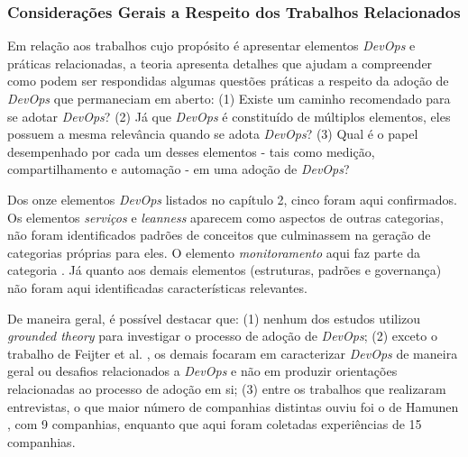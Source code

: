 \subsubsection{Considerações Gerais a Respeito dos Trabalhos Relacionados}

Em relação aos trabalhos cujo propósito é apresentar elementos {\it DevOps} e
práticas relacionadas, a teoria apresenta detalhes que ajudam a
compreender como podem ser respondidas algumas questões práticas a
respeito da adoção de {\it DevOps} que permaneciam em aberto: (1) Existe um caminho
recomendado para se adotar \textit{DevOps}? (2) Já que \textit{DevOps} é
constituído de múltiplos elementos, eles possuem a mesma relevância quando se
adota \textit{DevOps}? (3) Qual é o papel desempenhado por cada um desses
elementos - tais como medição, compartilhamento e automação - em uma adoção de
\textit{DevOps}?

Dos onze elementos {\it DevOps} listados no capítulo 2, cinco foram aqui
confirmados. Os elementos \emph{serviços} e \emph{leanness} aparecem como
aspectos de outras categorias, não foram identificados padrões de conceitos
que culminassem na geração de categorias próprias para eles. O elemento
\emph{monitoramento} aqui faz parte da categoria . Já
quanto aos demais elementos (estruturas, padrões e governança) não foram aqui
identificadas características relevantes.

De maneira geral, é possível destacar que: (1) nenhum dos estudos utilizou
{\it grounded theory} para investigar o processo de adoção de {\it DevOps};
(2) exceto o trabalho de Feijter et al. \cite{feijter2017towards}, os demais
focaram em caracterizar {\it DevOps} de maneira geral ou desafios relacionados
a {\it DevOps} e não em produzir orientações relacionadas ao processo de adoção
em si; (3) entre os trabalhos que realizaram entrevistas, o que maior número
de companhias distintas ouviu foi o de Hamunen \cite{challenges_in_adopting_devops},
com 9 companhias, enquanto que aqui foram coletadas experiências de 15 companhias.
